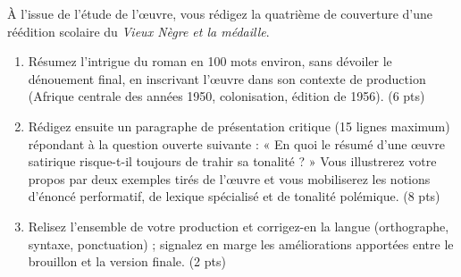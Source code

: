 \documentclass[11pt]{article}
\begin{document}
\begin{exercice}
À l'issue de l'étude de l'œuvre, vous rédigez la quatrième de couverture d'une réédition scolaire du \emph{Vieux Nègre et la médaille}.
\begin{enumerate}
\item Résumez l'intrigue du roman en 100 mots environ, sans dévoiler le dénouement final, en inscrivant l'œuvre dans son contexte de production (Afrique centrale des années 1950, colonisation, édition de 1956). (6 pts)
\item Rédigez ensuite un paragraphe de présentation critique (15 lignes maximum) répondant à la question ouverte suivante : « En quoi le résumé d'une œuvre satirique risque-t-il toujours de trahir sa tonalité ? » Vous illustrerez votre propos par deux exemples tirés de l'œuvre et vous mobiliserez les notions d'énoncé performatif, de lexique spécialisé et de tonalité polémique. (8 pts)
\item Relisez l'ensemble de votre production et corrigez-en la langue (orthographe, syntaxe, ponctuation) ; signalez en marge les améliorations apportées entre le brouillon et la version finale. (2 pts)
\end{enumerate}
\end{exercice}
\end{document}
